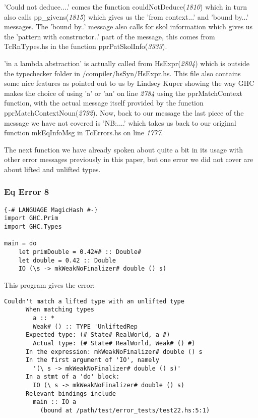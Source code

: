 \documentclass[a4paper]{article}
\begin{document}
'Could not deduce....' comes the function couldNotDeduce(\textit{1810}) which in turn also calls pp\_givens(\textit{1815}) which gives us the 'from context...' and 'bound by...' messages. The 'bound by..' message also calls for skol information which gives us the 'pattern with constructor..' part of the message, this comes from TcRnTypes.hs in the function pprPatSkolInfo(\textit{3333}). 

'in a lambda abstraction' is actually called from HsExpr(\textit{2804}) which is outside the typechecker folder in /compiler/hsSyn/HsExpr.hs. This file also contains some nice features as pointed out to us by Lindsey Kuper \cite{twitter1} showing the way GHC makes the choice of using 'a' or 'an' on line \textit{2784} using the pprMatchContext function, with the actual message itself provided by the function pprMatchContextNoun(\textit{2792}). Now, back to our message the last piece of the message we have not covered is 'NB:....' which takes us back to our original function mkEqInfoMsg in TcErrors.hs on line \textit{1777}.

The next function we have already spoken about quite a bit in its usage with other error messages previously in this paper, but one error we did not cover are about lifted and unlifted types.

\subsubsection{Eq Error 8}

\begin{lstlisting}[label={lst: T14.0}, numbers=none, caption={Example Program \cite{ex14}}]
{-# LANGUAGE MagicHash #-}
import GHC.Prim
import GHC.Types

main = do
    let primDouble = 0.42## :: Double#
    let double = 0.42 :: Double
    IO (\s -> mkWeakNoFinalizer# double () s)
\end{lstlisting}

This program gives the error:

\begin{lstlisting}[label={lst: T14.0.2}, numbers=none, caption={Error}]
 Couldn't match a lifted type with an unlifted type
      When matching types
        a :: *
        Weak# () :: TYPE 'UnliftedRep
      Expected type: (# State# RealWorld, a #)
        Actual type: (# State# RealWorld, Weak# () #)
      In the expression: mkWeakNoFinalizer# double () s
      In the first argument of 'IO', namely
        '(\ s -> mkWeakNoFinalizer# double () s)'
      In a stmt of a 'do' block:
        IO (\ s -> mkWeakNoFinalizer# double () s)
      Relevant bindings include
        main :: IO a
          (bound at /path/test/error_tests/test22.hs:5:1)
\end{lstlisting}
\end{document}
